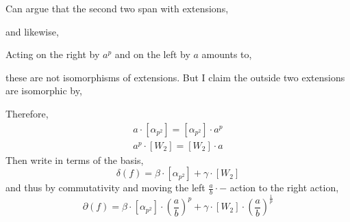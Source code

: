 \documentclass[12pt]{article}
\begin{document}
Can argue that the second two span with extensions,
\begin{center}
\end{center}
and likewise,
\begin{center}
\end{center}
Acting on the right by $a^p$ and on the left by $a$ amounts to,
\begin{center}
\end{center}
these are not isomorphisms of extensions. 
But I claim the outside two extensions are isomorphic by,
\begin{center}
\end{center}
Therefore,
\begin{align*}
a \cdot [\alpha_{p^2}] = [\alpha_{p^2}] \cdot a^p
\\
a^p \cdot [W_2] = [W_2] \cdot a 
\end{align*}
Then write in terms of the basis,
\[ \delta(f) = \beta \cdot [\alpha_{p^2}] + \gamma \cdot [W_2] \]
and thus by commutativity and moving the left $\frac{a}{b} \cdot -$ action to the right action,
\[ \partial(f) = \beta \cdot [\alpha_{p^2}] \cdot \left( \frac{a}{b} \right)^p + \gamma \cdot [W_2] \cdot \left( \frac{a}{b} \right)^{\frac{1}{p}} \]
\end{document}
